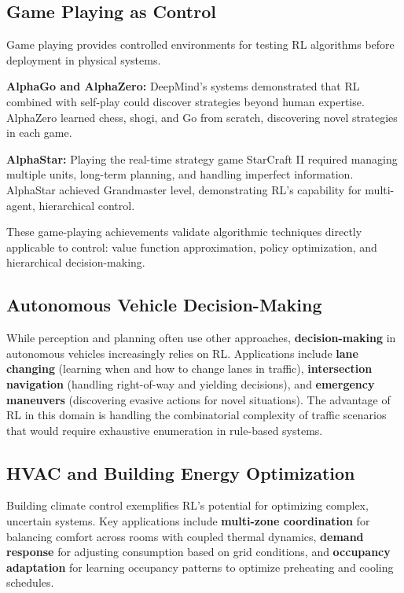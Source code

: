 \subsection{Game Playing as Control}

Game playing provides controlled environments for testing RL algorithms before deployment in physical systems.

\textbf{AlphaGo and AlphaZero:} DeepMind's systems demonstrated that RL combined with self-play could discover strategies beyond human expertise. AlphaZero learned chess, shogi, and Go from scratch, discovering novel strategies in each game.

\textbf{AlphaStar:} Playing the real-time strategy game StarCraft II required managing multiple units, long-term planning, and handling imperfect information. AlphaStar achieved Grandmaster level, demonstrating RL's capability for multi-agent, hierarchical control.

These game-playing achievements validate algorithmic techniques directly applicable to control: value function approximation, policy optimization, and hierarchical decision-making.

\subsection{Autonomous Vehicle Decision-Making}

While perception and planning often use other approaches, \textbf{decision-making} in autonomous vehicles increasingly relies on RL. Applications include \textbf{lane changing} (learning when and how to change lanes in traffic), \textbf{intersection navigation} (handling right-of-way and yielding decisions), and \textbf{emergency maneuvers} (discovering evasive actions for novel situations). The advantage of RL in this domain is handling the combinatorial complexity of traffic scenarios that would require exhaustive enumeration in rule-based systems.

\subsection{HVAC and Building Energy Optimization}

Building climate control exemplifies RL's potential for optimizing complex, uncertain systems. Key applications include \textbf{multi-zone coordination} for balancing comfort across rooms with coupled thermal dynamics, \textbf{demand response} for adjusting consumption based on grid conditions, and \textbf{occupancy adaptation} for learning occupancy patterns to optimize preheating and cooling schedules.

